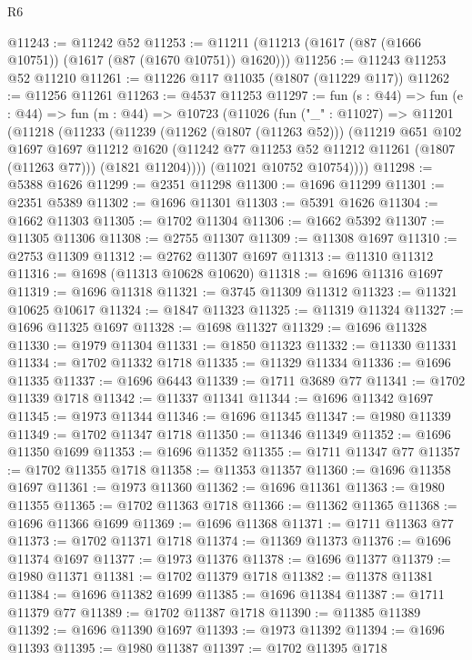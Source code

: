 \begin{lexlean}{R6}
\begin{coremodule}
@11243 := @11242 @52
@11253 := @11211 (@11213 (@1617 (@87 (@1666 @10751)) (@1617 (@87 (@1670 @10751)) @1620)))
@11256 := @11243 @11253 @52 @11210
@11261 := @11226 @117 @11035 (@1807 (@11229 @117))
@11262 := @11256 @11261
@11263 := @4537 @11253
@11297 := fun (s : @44) =>
  fun (e : @44) =>
  fun (m : @44) =>
  @10723
    (@11026
      (fun ("_" : @11027) =>
      @11201
        (@11218
          (@11233
            (@11239
              (@11262 (@1807 (@11263 @52)))
              (@11219
                @651
                @102
                @1697
                @1697
                @11212
                @1620
                (@11242 @77 @11253 @52 @11212 @11261 (@1807 (@11263 @77)))
                (@1821 @11204))))
          (@11021 @10752 @10754))))
@11298 := @5388 @1626
@11299 := @2351 @11298
@11300 := @1696 @11299
@11301 := @2351 @5389
@11302 := @1696 @11301
@11303 := @5391 @1626
@11304 := @1662 @11303
@11305 := @1702 @11304
@11306 := @1662 @5392
@11307 := @11305 @11306
@11308 := @2755 @11307
@11309 := @11308 @1697
@11310 := @2753 @11309
@11312 := @2762 @11307 @1697
@11313 := @11310 @11312
@11316 := @1698 (@11313 @10628 @10620)
@11318 := @1696 @11316 @1697
@11319 := @1696 @11318
@11321 := @3745 @11309 @11312
@11323 := @11321 @10625 @10617
@11324 := @1847 @11323
@11325 := @11319 @11324
@11327 := @1696 @11325 @1697
@11328 := @1698 @11327
@11329 := @1696 @11328
@11330 := @1979 @11304
@11331 := @1850 @11323
@11332 := @11330 @11331
@11334 := @1702 @11332 @1718
@11335 := @11329 @11334
@11336 := @1696 @11335
@11337 := @1696 @6443
@11339 := @1711 @3689 @77
@11341 := @1702 @11339 @1718
@11342 := @11337 @11341
@11344 := @1696 @11342 @1697
@11345 := @1973 @11344
@11346 := @1696 @11345
@11347 := @1980 @11339
@11349 := @1702 @11347 @1718
@11350 := @11346 @11349
@11352 := @1696 @11350 @1699
@11353 := @1696 @11352
@11355 := @1711 @11347 @77
@11357 := @1702 @11355 @1718
@11358 := @11353 @11357
@11360 := @1696 @11358 @1697
@11361 := @1973 @11360
@11362 := @1696 @11361
@11363 := @1980 @11355
@11365 := @1702 @11363 @1718
@11366 := @11362 @11365
@11368 := @1696 @11366 @1699
@11369 := @1696 @11368
@11371 := @1711 @11363 @77
@11373 := @1702 @11371 @1718
@11374 := @11369 @11373
@11376 := @1696 @11374 @1697
@11377 := @1973 @11376
@11378 := @1696 @11377
@11379 := @1980 @11371
@11381 := @1702 @11379 @1718
@11382 := @11378 @11381
@11384 := @1696 @11382 @1699
@11385 := @1696 @11384
@11387 := @1711 @11379 @77
@11389 := @1702 @11387 @1718
@11390 := @11385 @11389
@11392 := @1696 @11390 @1697
@11393 := @1973 @11392
@11394 := @1696 @11393
@11395 := @1980 @11387
@11397 := @1702 @11395 @1718

\end{coremodule}
\end{lexlean}
